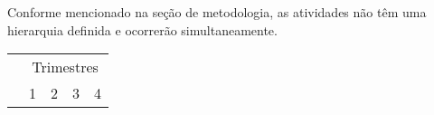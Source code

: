 \documentclass[11pt]{article}
\begin{document}
\begin{enumerate}
\end{enumerate}


Conforme mencionado na seção de metodologia, as atividades não têm uma
hierarquia definida e ocorrerão simultaneamente.

\begin{tabular}{l|cccc}
  & \multicolumn{4}{c}{Trimestres}\\
  & 1 & 2 & 3 & 4 \\
  \hline
\end{tabular}



\renewcommand{\refname}{
  \hspace{1.5em}\textcolor{blue}{6.\hspace{.5em}Referências
    Bibliográficas (máximo de 10 referências)}
}



\end{document}
